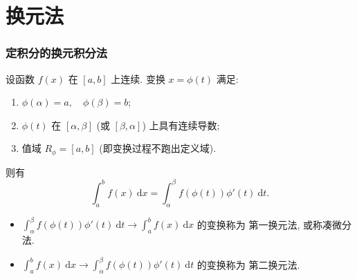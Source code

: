 
\section{换元法}


\begin{frame}
\frametitle{定积分的换元积分法}

\begin{thm}[换元积分法]
设函数 $f(x)$ 在 $[a, b]$ 上连续. 变换 $x = \phi(t)$ 满足:
\begin{enumerate}
\item $\phi(\alpha) = a, \quad \phi(\beta) = b$;
\item $\phi(t)$ 在 $[\alpha, \beta]$ (或 $[\beta, \alpha]$) 上具有连续导数;
\item 值域 $R_{\phi} = [a, b]$ (即变换过程不跑出定义域).
\end{enumerate}
则有
\[ \int_a^b f(x) ~ \mathrm{d}x = \int_{\alpha}^{\beta} f(\phi(t)) \phi'(t) ~ \mathrm{d}t. \]
\end{thm}

\pause
\vspace{1em}

\begin{itemize}
\item $\int_{\alpha}^{\beta} f(\phi(t)) \phi'(t) ~ \mathrm{d}t \longrightarrow \int_a^b f(x) ~ \mathrm{d}x$ 的变换称为 \alert{第一换元法, 或称凑微分法}.
\item $\int_a^b f(x) ~ \mathrm{d}x \longrightarrow \int_{\alpha}^{\beta} f(\phi(t)) \phi'(t) ~ \mathrm{d}t$ 的变换称为 \alert{第二换元法}.
\end{itemize}

\end{frame}


